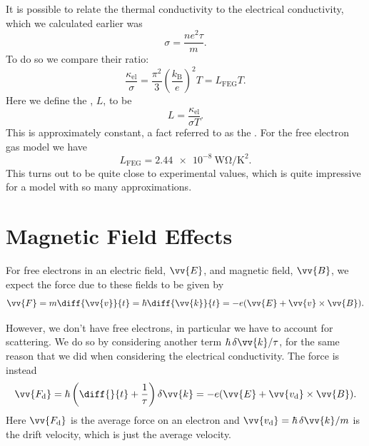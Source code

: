 \documentclass[fleqn]{NotesClass}
\newcommand*{\boltzmann}{k_{\mathrm{B}}}
\begin{document}
    It is possible to relate the thermal conductivity to the electrical conductivity, which we calculated earlier was
    \begin{equation}
        \sigma = \frac{ne^2\tau}{m}.
    \end{equation}
    To do so we compare their ratio:
    \begin{equation}
        \frac{\kappa_{\mathrm{el}}}{\sigma} = \frac{\pi^2}{3} \left( \frac{\boltzmann}{e} \right)^2 T = L_{\mathrm{FEG}} T.
    \end{equation}
    Here we define the , \(L\), to be
    \begin{equation}
        L = \frac{\kappa_{\mathrm{el}}}{\sigma T}.
    \end{equation}
    This is approximately constant, a fact referred to as the .
    For the free electron gas model we have
    \begin{equation}
        L_{\mathrm{FEG}} = \qty{2.44e-8}{\watt\ohm\per\kelvin\squared}.
    \end{equation}
    This turns out to be quite close to experimental values, which is quite impressive for a model with so many approximations.
    
    \section{Magnetic Field Effects}
    For free electrons in an electric field, \(\vv{E}\), and magnetic field, \(\vv{B}\), we expect the force due to these fields to be given by
    \begin{equation}
        \vv{F} = m\diff{\vv{v}}{t} = \hbar \diff{\vv{k}}{t} = -e(\vv{E} + \vv{v} \times \vv{B}).
    \end{equation}

    However, we don't have free electrons, in particular we have to account for scattering.
    We do so by considering another term \(\hbar\,\delta\vv{k}/\tau\), for the same reason that we did when considering the electrical conductivity.
    The force is instead
    \begin{equation}
        \vv{F_{\mathrm{d}}} = \hbar \left( \diff{}{t} + \frac{1}{\tau} \right)\delta\vv{k} = -e(\vv{E} + \vv{v_{\mathrm{d}}} \times \vv{B}).
    \end{equation}
    Here \(\vv{F_{\mathrm{d}}}\) is the average force on an electron and \(\vv{v_{\mathrm{d}}} = \hbar\,\delta\vv{k}/m\) is the drift velocity, which is just the average velocity.
    
\end{document}
